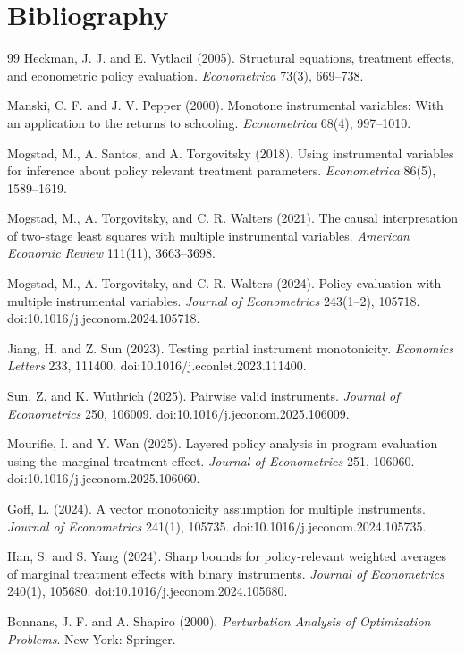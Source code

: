 \documentclass[11pt]{article}
\theoremstyle{definition}
\theoremstyle{plain}
\theoremstyle{remark}
\begin{document}
\section*{Bibliography}
\begin{thebibliography}{99}
Heckman, J. J. and E. Vytlacil (2005).
Structural equations, treatment effects, and econometric policy evaluation.
\emph{Econometrica} 73(3), 669--738.

Manski, C. F. and J. V. Pepper (2000).
Monotone instrumental variables: With an application to the returns to schooling.
\emph{Econometrica} 68(4), 997--1010.

Mogstad, M., A. Santos, and A. Torgovitsky (2018).
Using instrumental variables for inference about policy relevant treatment parameters.
\emph{Econometrica} 86(5), 1589--1619.

Mogstad, M., A. Torgovitsky, and C. R. Walters (2021).
The causal interpretation of two-stage least squares with multiple instrumental variables.
\emph{American Economic Review} 111(11), 3663--3698.

Mogstad, M., A. Torgovitsky, and C. R. Walters (2024).
Policy evaluation with multiple instrumental variables.
\emph{Journal of Econometrics} 243(1--2), 105718.
doi:10.1016/j.jeconom.2024.105718.

Jiang, H. and Z. Sun (2023).
Testing partial instrument monotonicity.
\emph{Economics Letters} 233, 111400.
doi:10.1016/j.econlet.2023.111400.

Sun, Z. and K. Wuthrich (2025).
Pairwise valid instruments.
\emph{Journal of Econometrics} 250, 106009.
doi:10.1016/j.jeconom.2025.106009.

Mourifie, I. and Y. Wan (2025).
Layered policy analysis in program evaluation using the marginal treatment effect.
\emph{Journal of Econometrics} 251, 106060.
doi:10.1016/j.jeconom.2025.106060.

Goff, L. (2024).
A vector monotonicity assumption for multiple instruments.
\emph{Journal of Econometrics} 241(1), 105735.
doi:10.1016/j.jeconom.2024.105735.

Han, S. and S. Yang (2024).
Sharp bounds for policy-relevant weighted averages of marginal treatment effects with binary instruments.
\emph{Journal of Econometrics} 240(1), 105680.
doi:10.1016/j.jeconom.2024.105680.

Bonnans, J. F. and A. Shapiro (2000).
\emph{Perturbation Analysis of Optimization Problems}.
New York: Springer.
\end{thebibliography}
\end{document}
